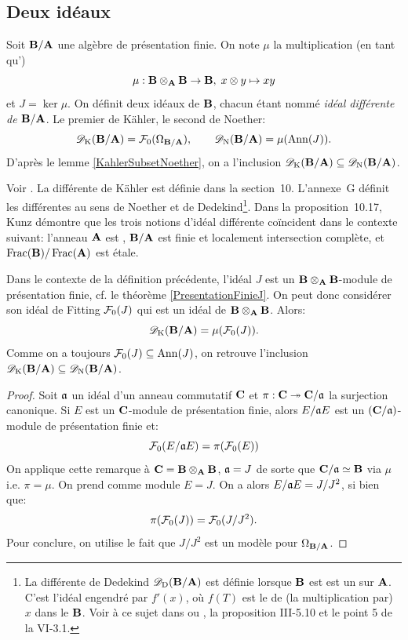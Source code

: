 \documentclass[12pt,twoside,a4paper]{article}
\begin{document}
\subsection{Deux idéaux }



\begin {definition} 

Soit $\mathbf{B}/\mathbf{A}$ une algèbre de présentation finie. On note $\mu$ la multiplication (en tant qu'\Ali)
\[
\mu : \mathbf{B}\otimes_{\mathbf{A}}\mathbf{B} \to \mathbf{B},\;x\otimes y\mapsto xy
\] 
et $J=\ker\mu$.
On définit deux idéaux de $\mathbf{B}$, chacun étant nommé \textsl{idéal différente de
$\mathbf{B}/\mathbf{A}$}. Le premier de Kähler, le second de Noether:
$$
\mathscr{D}_{\rm K}(\mathbf{B}/\mathbf{A}) = {\cal F}_0(\Omega_{\mathbf{B}/\mathbf{A}}),
\qquad
\mathscr{D}_{\rm N}(\mathbf{B}/\mathbf{A}) = \mu(\mathrm{Ann}(J)).
$$
D'après le lemme \ref{KahlerSubsetNoether}, on a l'inclusion $\mathscr{D}_{\rm K}(\mathbf{B}/\mathbf{A}) \subseteq  \mathscr{D}_{\rm N}(\mathbf{B}/\mathbf{A})$.
\end {definition}

\Note Voir \cite{Kunz}. La différente de Kähler est définie dans la section~10. L'annexe~G définit les différentes au sens de Noether et de Dedekind\footnote{La différente de Dedekind $\mathscr{D}_{\rm D}(\mathbf{B}/\mathbf{A})$ est définie lorsque $\mathbf{B}$ est est un \mptf sur $\mathbf{A}$. C'est l'idéal engendré par  $f'(x)$, où $f(T)$ est le \polcar de (la multiplication par)~$x$ dans le \Amo \ptf $\mathbf{B}$. Voir à ce sujet dans \cite{CACM} ou \cite{ACMC}, la proposition III-5.10 et le point 5 de la \dfn VI-3.1.}. Dans la proposition~10.17, Kunz démontre que les trois notions d'idéal différente coïncident dans le contexte suivant: l'anneau $\mathbf{A}$ est \noe, $\mathbf{B}/\mathbf{A}$ est finie et localement intersection complète, et $\mathop{\mathrm{Frac}}\nolimits(\mathbf{B})/\mathop{\mathrm{Frac}}\nolimits(\mathbf{A})$ est étale. \eoe

\begin {lemma} %

Dans le contexte de la définition précédente, l'idéal $J$ est un $\mathbf{B}\otimes_{\mathbf{A}}\mathbf{B}$-module de présentation
finie, cf. le théorème \ref{PresentationFinieJ}.
On peut donc considérer son idéal de Fitting ${\cal F}_0(J)$ qui est un idéal de $\mathbf{B}\otimes_{\mathbf{A}}\mathbf{B}$.
Alors:
$$
\mathscr{D}_{\rm K}(\mathbf{B}/\mathbf{A}) = \mu({\cal F}_0(J)).
$$
Comme on a toujours ${\cal F}_0(J) \subseteq \mathrm{Ann}(J)$, on retrouve l'inclusion
$\mathscr{D}_{\rm K}(\mathbf{B}/\mathbf{A})\subseteq \mathscr{D}_{\rm N}(\mathbf{B}/\mathbf{A})$.
\end {lemma}

\begin {proof} %

Soit $\mathfrak{a}$ un idéal d'un anneau commutatif $\mathbf{C}$ et $\pi : \mathbf{C} \twoheadrightarrow \mathbf{C}/\mathfrak{a}$
la surjection canonique. Si $E$ est un $\mathbf{C}$-module de présentation finie,
alors $E/\mathfrak{a} E$ est un $(\mathbf{C}/\mathfrak{a})$-module de présentation finie et:
$$
{\cal F}_0(E/\mathfrak{a} E) = \pi({\cal F}_0(E))
$$
On applique cette remarque à $\mathbf{C} = \mathbf{B}\otimes_{\mathbf{A}}\mathbf{B}$, $\mathfrak{a}=J$ de sorte que
$\mathbf{C}/\mathfrak{a} \simeq \mathbf{B}$ via $\mu$ i.e. $\pi = \mu$.
On prend comme module $E = J$. On a alors $E/\mathfrak{a} E = J/J^2$, si
bien que:
$$
\pi({\cal F}_0(J)) = {\cal F}_0(J/J^2).
$$
Pour conclure, on utilise le fait que $J/J^2$ est un modèle pour
$\Omega_{\mathbf{B}/\mathbf{A}}$.
\end {proof}
\end{document}

